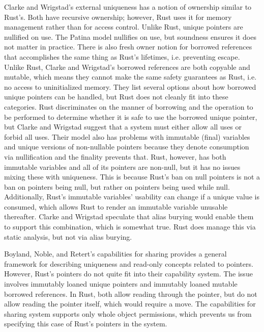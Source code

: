 Clarke and Wrigstad's external uniqueness \cite{externaluniqueness} has a notion
of ownership similar to Rust's. Both have recursive ownership; however, Rust uses
it for memory management rather than for access control.
Unlike Rust, unique pointers are nullified on use. The Patina model nullifies on use,
but soundness ensures it does not matter in practice.
There is also fresh owner notion for borrowed references that accomplishes the same
thing as Rust's lifetimes, i.e. preventing escape.
Unlike Rust, Clarke and Wrigstad's borrowed references are both copyable and mutable,
which means they cannot make the same safety guarantees as Rust, i.e. no access to
uninitialized memory.
They list several options about how borrowed unique pointers can be handled, but
Rust does not cleanly fit into these categories. Rust discriminates on the manner of borrowing
and the operation to be performed to determine whether it is safe to use the borrowed
unique pointer, but Clarke and Wrigstad suggest that a system must either allow all uses
or forbid all uses.
Their model also has problems with immutable (final) variables and unique versions
of non-nullable pointers because they denote consumption via nullification and the finality
prevents that. Rust, however, has both immutable variables and all of its pointers are non-null,
but it has no issues mixing these with uniqueness. This is because Rust's ban on null pointers
is not a ban on pointers being null, but rather on pointers being used while null.
Additionally, Rust's immutable variables' usability can change if a unique value is consumed,
which allows Rust to render an immutable variable unusable thereafter.
Clarke and Wrigstad speculate that alias burying would enable them to support this combination,
which is somewhat true. Rust does manage this via static analysis, but not via alias burying.

Boyland, Noble, and Retert's capabilities for sharing \cite{capabilitiesforsharing}
provides a general framework for describing uniqueness and read-only concepts related
to pointers. However, Rust's pointers do not quite fit into their capability system.
The issue involves immutably loaned unique pointers and immutably loaned mutable borrowed
references. In Rust, both allow reading through the pointer, but do not allow reading
the pointer itself, which would require a move. The capabilities for sharing system
supports only whole object permissions, which prevents us from specifying this case
of Rust's pointers in the system.
